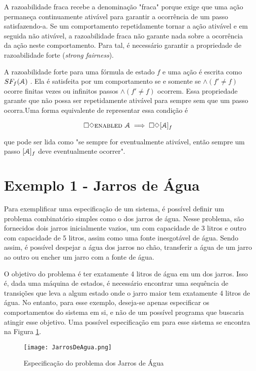 A razoabilidade fraca recebe a denominação "fraca" porque exige que uma ação permaneça continuamente ativável para garantir a ocorrência de um passo satisfazendo-a. Se um comportamento repetidamente tornar a ação ativável e em seguida não ativável, a razoabilidade fraca não garante nada sobre a ocorrência da ação neste comportamento. Para tal, é necessário garantir a propriedade de razoabilidade forte (\textit{strong fairness}).

A razoabilidade forte para uma fórmula de estado $f$ e uma ação \FANCYA é escrita como $SF_f (\textbf{$\mathcal{A}$})$ . Ela é satisfeita por um comportamento se e somente se \FANCYA $\land (f' \neq f)$ ocorre finitas vezes ou infinitos passos \FANCYA $\land (f' \neq f)$ ocorrem. Essa propriedade garante que \FANCYA não possa ser repetidamente ativável para sempre sem que um passo \FANCYA ocorra.Uma forma equivalente de representar essa condição é

\[\square \Diamond \textsc{enabled } \textbf{$\mathcal{A}$} \implies \square \Diamond[\textbf{$\mathcal{A}$}]_f\]

que pode ser lida como "se sempre \FANCYA for eventualmente ativável, então sempre um passo $[\textbf{$\mathcal{A}$}]_f$ deve eventualmente ocorrer".

\section{Exemplo 1 - Jarros de Água}
\label{exemplo1}

Para exemplificar uma especificação de um sistema, é possível definir um problema combinatório simples como o dos jarros de água. Nesse problema, são fornecidos dois jarros inicialmente vazios, um com capacidade de 3 litros e outro com capacidade de 5 litros, assim como uma fonte inesgotável de água. Sendo assim, é possível despejar a água dos jarros no chão, transferir a água de um jarro ao outro ou encher um jarro com a fonte de água.

O objetivo do problema é ter exatamente 4 litros de água em um dos jarros. Isso é, dada uma máquina de estados, é necessário encontrar uma sequência de transições que leva a algum estado onde o jarro maior tem exatamente 4 litros de água. No entanto, para esse exemplo, deseja-se apenas especificar os comportamentos do sistema em si, e não de um possível programa que buscaria atingir esse objetivo. Uma possível especificação em \TLA para esse sistema se encontra na Figura \ref{fig:ex1tla}.

\begin{figure}
  \centering
  \texttt{[image: JarrosDeAgua.png]}
  \caption{Especificação do problema dos Jarros de Água}
  \label{fig:ex1tla}
\end{figure}

